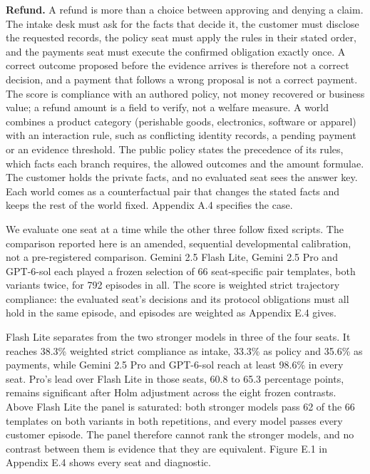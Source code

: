 \textbf{Refund.} A refund is more than a choice between approving and denying a claim. The intake desk must ask for the
facts that decide it, the customer must disclose the requested records, the policy seat must apply the rules in their
stated order, and the payments seat must execute the confirmed obligation exactly once. A correct outcome proposed
before the evidence arrives is therefore not a correct decision, and a payment that follows a wrong proposal is not a
correct payment. The score is compliance with an authored policy, not money recovered or business value; a refund
amount is a field to verify, not a welfare measure. A world combines a product category (perishable goods,
electronics, software or apparel) with an interaction rule, such as conflicting identity records, a pending payment
or an evidence threshold. The public policy states the precedence of its rules, which facts each branch requires, the
allowed outcomes and the amount formulae. The customer holds the private facts, and no evaluated seat sees the answer
key. Each world comes as a counterfactual pair that changes the stated facts and keeps the rest of the world fixed.
Appendix A.4 specifies the case.

We evaluate one seat at a time while the other three follow fixed scripts. The comparison reported here is an
amended, sequential developmental calibration, not a pre-registered comparison. Gemini 2.5 Flash Lite, Gemini 2.5
Pro and GPT-6-sol each played a frozen selection of 66 seat-specific pair templates, both variants twice, for 792
episodes in all. The score is weighted strict trajectory compliance: the evaluated seat's decisions and its
protocol obligations must all hold in the same episode, and episodes are weighted as Appendix E.4 gives.

Flash Lite separates from the two stronger models in three of the four seats. It reaches 38.3\% weighted strict compliance
as intake, 33.3\% as policy and 35.6\% as payments, while Gemini 2.5 Pro and GPT-6-sol reach at least 98.6\% in every
seat. Pro's lead over Flash Lite in those seats, 60.8 to 65.3 percentage points, remains significant after Holm
adjustment across the eight frozen contrasts. Above Flash Lite the panel is saturated: both stronger models pass 62
of the 66 templates on both variants in both repetitions, and every model passes every customer episode. The panel
therefore cannot rank the stronger models, and no contrast between them is evidence that they are equivalent.
Figure E.1 in Appendix E.4 shows every seat and diagnostic.


